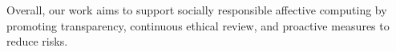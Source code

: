 \documentclass[sigconf]{acmart}
\begin{document}
Overall, our work aims to support socially responsible affective computing by promoting transparency, continuous ethical review, and proactive measures to reduce risks.





\end{document}
